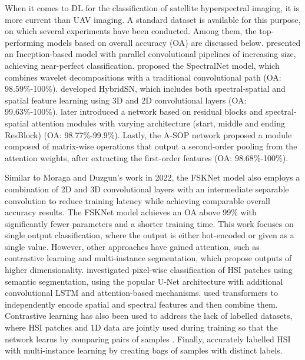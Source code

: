 When it comes to DL for the classification of satellite hyperspectral imaging, it is more current than UAV imaging. A standard dataset is available for this purpose, on which several experiments have been conducted. Among them, the top-performing models based on overall accuracy (OA) are discussed below. \cite{moraga_jigsawhsi_2022} presented an Inception-based model with parallel convolutional pipelines of increasing size, achieving near-perfect classification. \cite{chakraborty_spectralnet_2021} proposed the SpectralNet model, which combines wavelet decompositions with a traditional convolutional path (OA: 98.59\%-100\%). \cite{roy_hybridsn_2020} developed HybridSN, which includes both spectral-spatial and spatial feature learning using 3D and 2D convolutional layers (OA: 99.63\%-100\%). \cite{roy_attention-based_2021} later introduced a network based on residual blocks and spectral-spatial attention modules with varying architecture (start, middle and ending ResBlock) (OA: 98.77\%-99.9\%). Lastly, the A-SOP network \cite{xue_attention-based_2021} proposed a module composed of matrix-wise operations that output a second-order pooling from the attention weights, after extracting the first-order features (OA: 98.68\%-100\%). 

Similar to Moraga and Duzgun's work in 2022, the FSKNet model also employs a combination of 2D and 3D convolutional layers with an intermediate separable convolution to reduce training latency while achieving comparable overall accuracy results. The FSKNet model achieves an OA above 99\% with significantly fewer parameters and a shorter training time. This work focuses on single output classification, where the output is either hot-encoded or given as a single value. However, other approaches have gained attention, such as contrastive learning and multi-instance segmentation, which propose outputs of higher dimensionality. \cite{zhu_spectral-spatial-dependent_2021} investigated pixel-wise classification of HSI patches using semantic segmentation, using the popular U-Net architecture with additional convolutional LSTM and attention-based mechanisms. \cite{xin_convolution_2022} used transformers to independently encode spatial and spectral features and then combine them. Contrastive learning has also been used to address the lack of labelled datasets, where HSI patches and 1D data are jointly used during training so that the network learns by comparing pairs of samples \cite{guan_spatial-spectral_2022}. Finally, \cite{meerdink_multitarget_2022} accurately labelled HSI with multi-instance learning by creating bags of samples with distinct labels.

